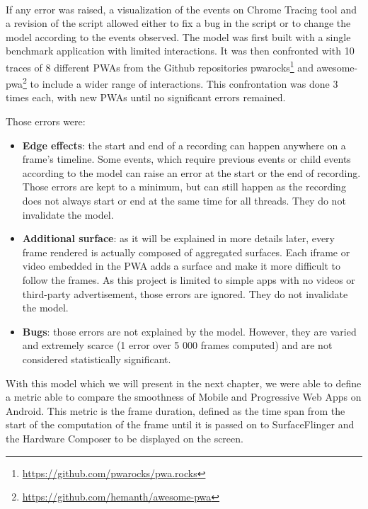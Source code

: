     \paragraph{}
    If any error was raised, a visualization of the events on Chrome Tracing tool and a revision of the script allowed either to fix a bug in the script or to change the model according to the events observed. \newline
    The model was first built with a single benchmark application with limited interactions. It was then confronted with 10 traces of 8 different PWAs from the Github repositories pwarocks\footnote{\url{https://github.com/pwarocks/pwa.rocks}} and awesome-pwa\footnote{\url{https://github.com/hemanth/awesome-pwa}} to include a wider range of interactions. This confrontation was done 3 times each, with new PWAs until no significant errors remained.
    
    Those errors were:
    \begin{itemize}
        \item \textbf{Edge effects}: the start and end of a recording can happen anywhere on a frame's timeline. Some events, which require previous events or child events according to the model can raise an error at the start or the end of recording. Those errors are kept to a minimum, but can still happen as the recording does not always start or end at the same time for all threads. They do not invalidate the model.
        \item \textbf{Additional surface}: as it will be explained in more details later, every frame rendered is actually composed of aggregated surfaces. Each iframe or video embedded in the PWA adds a surface and make it more difficult to follow the frames. As this project is limited to simple apps with no videos or third-party advertisement, those errors are ignored. They do not invalidate the model.
        \item \textbf{Bugs}: those errors are not explained by the model. However, they are varied and extremely scarce (1 error over 5 000 frames computed) and are not considered statistically significant.
    \end{itemize}
    
With this model which we will present in the next chapter, we were able to define a metric able to compare the smoothness of Mobile and Progressive Web Apps on Android. This metric is the frame duration, defined as the time span from the start of the computation of the frame until it is passed on to SurfaceFlinger and the Hardware Composer to be displayed on the screen.

